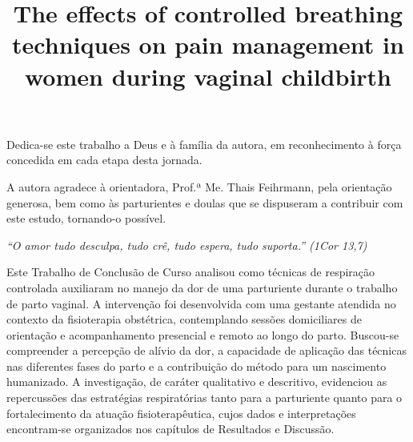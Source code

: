 \documentclass[openright]{tex/estilos/normas-utf-tex}
\title{The effects of controlled breathing techniques on pain management in women during vaginal childbirth}
\renewcommand{\headrulewidth}{0pt}
\renewcommand{\footrulewidth}{0pt}
\begin{document}
\pagestyle{fancy}
\fancyhf{}
\fancyfoot[C]{\thepage}
\renewcommand{\headrulewidth}{0pt}
\renewcommand{\footrulewidth}{0pt}
\pdfstringdefDisableCommands{%
        \let\MakeUppercase\relax
}
\hypersetup{pageanchor=false}
\capa
\folhaderosto
{}

\begin{dedicatoria}
\vspace*{\fill}
Dedica-se este trabalho a Deus e à família da autora, em reconhecimento à força concedida em cada etapa desta jornada.\\[1ex]
\vspace*{\fill}
\end{dedicatoria}

\begin{agradecimentos}
A autora agradece à orientadora, Prof.ª Me. Thais Feihrmann, pela orientação generosa, bem como às parturientes e doulas que se dispuseram a contribuir com este estudo, tornando-o possível.
\end{agradecimentos}

\begin{epigrafe}
\begin{flushright}
\emph{``O amor tudo desculpa, tudo crê, tudo espera, tudo suporta.'' (1Cor 13,7)}
\end{flushright}
\end{epigrafe}

\begin{resumo}
Este Trabalho de Conclusão de Curso analisou como técnicas de respiração controlada auxiliaram no manejo da dor de uma parturiente durante o trabalho de parto vaginal. A intervenção foi desenvolvida com uma gestante atendida no contexto da fisioterapia obstétrica, contemplando sessões domiciliares de orientação e acompanhamento presencial e remoto ao longo do parto. Buscou-se compreender a percepção de alívio da dor, a capacidade de aplicação das técnicas nas diferentes fases do parto e a contribuição do método para um nascimento humanizado. A investigação, de caráter qualitativo e descritivo, evidenciou as repercussões das estratégias respiratórias tanto para a parturiente quanto para o fortalecimento da atuação fisioterapêutica, cujos dados e interpretações encontram-se organizados nos capítulos de Resultados e Discussão.
\end{resumo}
\end{document}
